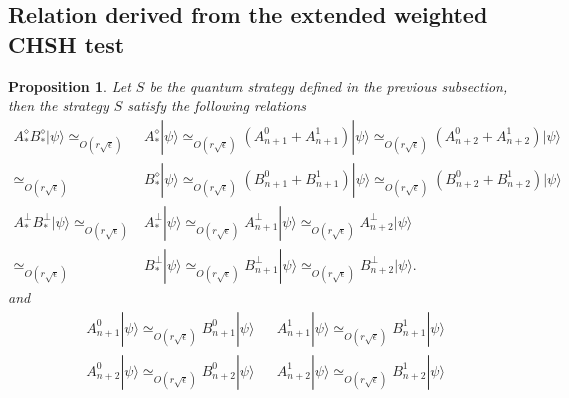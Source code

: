 \documentclass[11pt,letterpaper]{article}
\newcommand{\ket}[1]{|#1\rangle}
\newcommand{\1}{\mathbb{1}}
\newcommand{\se}{\sqrt{\epsilon}}
\newcommand{\appd}[1]{\simeq_{#1}}
\newtheorem{proposition}[theorem]{Proposition}
\theoremstyle{definition}
\begin{document}
\subsection{Relation derived from the extended weighted CHSH test}
\begin{proposition}
Let $S$ be the quantum strategy defined in the previous subsection,
then the strategy $S$ satisfy the following relations
\begin{align}
	  A_\ast^\diamond B_\ast^\diamond \ket{\psi}
	  \appd{O( r\se)}&A_\ast^\diamond \ket{\psi} \appd{O( r\se)} (A_{n+1}^0+A_{n+1}^1)\ket{\psi} \appd{O( r\se)} (A_{n+2}^0+A_{n+2}^1)\ket{\psi} \\
	  \appd{O( r\se)}&B_\ast^\diamond \ket{\psi} \appd{O( r\se)} (B_{n+1}^0+B_{n+1}^1)\ket{\psi} \appd{O( r\se)} (B_{n+2}^0+B_{n+2}^1)\ket{\psi}\\
	A_\ast^\perp B_\ast^\perp\ket{\psi}\appd{O( r\se)} &A_\ast^\perp\ket{\psi} \appd{O( r\se)} A_{n+1}^\perp \ket{\psi} \appd{O( r\se)} A_{n+2}^\perp \ket{\psi}\\
	\appd{O( r\se)}&B_\ast^\perp\ket{\psi} \appd{O( r\se)} B_{n+1}^\perp \ket{\psi} \appd{O( r\se)} B_{n+2}^\perp \ket{\psi}.
\end{align}
and
\begin{align}
&A_{n+1}^0 \ket{\psi} \appd{O( r\se)} B_{n+1}^0 \ket{\psi} && A_{n+1}^1\ket{\psi} \appd{O( r\se)} B_{n+1}^1 \ket{\psi}\\
&A_{n+2}^0 \ket{\psi} \appd{O( r\se)} B_{n+2}^0 \ket{\psi} && A_{n+2}^1\ket{\psi} \appd{O( r\se)} B_{n+2}^1 \ket{\psi}
\end{align}
\end{proposition}
\end{document}
